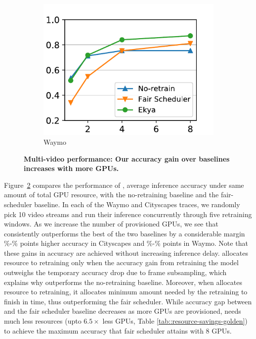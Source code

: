 \begin{figure}
\begin{subfigure}[t]{0.5\linewidth}
    \includegraphics[width=\linewidth]{results/multicam/waymo_across_resources.pdf} 
    \caption{Waymo}
    \label{fig:scalability-gpus-waymo-golden}
  \end{subfigure}
  \caption{\bf Multi-video performance: Our accuracy gain over baselines increases with more GPUs. }
  \label{fig:scalability-gpus}
\end{figure}

Figure~\ref{fig:scalability-gpus} compares the performance of \name, average inference accuracy under same amount of total GPU resource, with the no-retraining baseline and the fair-scheduler baseline.
In each of the Waymo and Cityscapes traces, we randomly pick 10 video streams and run their inference concurrently through five retraining windows.
As we increase the number of provisioned GPUs, we see that \name consistently outperforms the best of the two baselines by a considerable margin
\%-\% points higher accuracy in Cityscapes and \%-\% points in Waymo.
Note that these gains in accuracy are achieved without increasing inference delay.
\name allocates resource to retraining only when the accuracy gain from retraining the model outweighs the temporary accuracy drop due to frame subsampling, which explains why \name outperforms the no-retraining baseline. 
Moreover, when \name allocates resource to retraining, it allocates minimum amount needed by the retraining to finish in time, thus outperforming the fair scheduler.
While accuracy gap between \name{} and the fair scheduler baseline decreases as more GPUs are provisioned, \name needs much less resources (upto $6.5\times$ less GPUs, Table \ref{tab::resource-savings-golden}) to achieve the maximum accuracy that fair scheduler attains with 8 GPUs.

